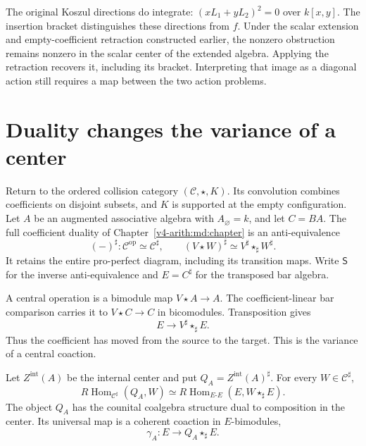 The original Koszul directions do integrate:
$(xL_1+yL_2)^2=0$ over $k[x,y]$.
The insertion bracket distinguishes these
directions from $f$. Under the scalar
extension and empty-coefficient retraction
constructed earlier, the nonzero obstruction
remains nonzero in the scalar center of
the extended algebra. Applying the
retraction recovers it, including its
bracket. Interpreting that image as a
diagonal action still requires a map
between the two action problems.

\section{Duality changes the variance of a center}
\label{v4-arith:centers:sec:polarity}

Return to the ordered collision category
$(\mathcal C,\star,K)$. Its convolution combines
coefficients on disjoint subsets, and $K$ is
supported at the empty configuration. Let $A$
be an augmented associative algebra with
$A_\varnothing=k$, and let $C=BA$.
The full coefficient duality of
Chapter~\ref{v4-arith:md:chapter} is an
anti-equivalence
\[
 (-)^\sharp:\mathcal C^{\mathrm{op}}\simeq\mathcal C^\sharp,
 \qquad
 (V\star W)^\sharp\simeq
 V^\sharp\star_\sharp W^\sharp.
\]
It retains the entire pro-perfect diagram,
including its transition maps. Write
$\mathsf S$ for the inverse anti-equivalence
and $E=C^\sharp$ for the transposed bar algebra.

A central operation is a bimodule map
$V\star A\to A$. The coefficient-linear
bar comparison carries it to
$V\star C\to C$ in bicomodules.
Transposition gives
\[
 E\longrightarrow V^\sharp\star_\sharp E.
\]
Thus the coefficient has moved from the
source to the target. This is the variance
of a central coaction.

\begin{theorem}\label{v4-arith:centers:thm:coaction}
Let $Z^{\mathrm{int}}(A)$ be the internal
center and put $Q_A=Z^{\mathrm{int}}(A)^\sharp$.
For every $W\in\mathcal C^\sharp$,
\[
 R\operatorname{Hom}_{\mathcal C^\sharp}(Q_A,W)
 \simeq
 R\operatorname{Hom}_{E\text{-}E}
       (E,W\star_\sharp E).
\]
The object $Q_A$ has the counital coalgebra
structure dual to composition in the center.
Its universal map is a coherent coaction
in $E$-bimodules,
\[
 \gamma_A:E\longrightarrow Q_A\star_\sharp E.
\]
\end{theorem}

